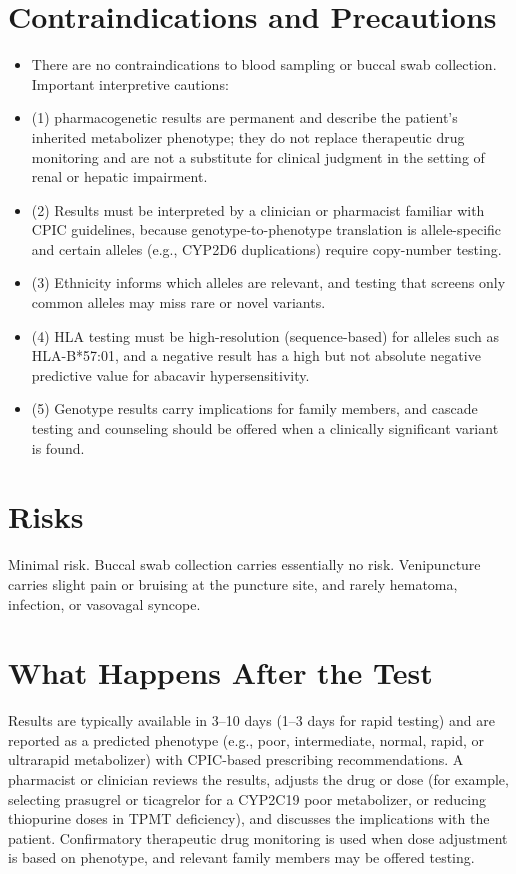 \section*{Contraindications and Precautions}
\begin{itemize}
  \item There are no contraindications to blood sampling or buccal swab collection. Important interpretive cautions:
  \item (1) pharmacogenetic results are permanent and describe the patient's inherited metabolizer phenotype; they do not replace therapeutic drug monitoring and are not a substitute for clinical judgment in the setting of renal or hepatic impairment.
  \item (2) Results must be interpreted by a clinician or pharmacist familiar with CPIC guidelines, because genotype-to-phenotype translation is allele-specific and certain alleles (e.g., CYP2D6 duplications) require copy-number testing.
  \item (3) Ethnicity informs which alleles are relevant, and testing that screens only common alleles may miss rare or novel variants.
  \item (4) HLA testing must be high-resolution (sequence-based) for alleles such as HLA-B*57:01, and a negative result has a high but not absolute negative predictive value for abacavir hypersensitivity.
  \item (5) Genotype results carry implications for family members, and cascade testing and counseling should be offered when a clinically significant variant is found.
\end{itemize}
\section*{Risks}
Minimal risk. Buccal swab collection carries essentially no risk. Venipuncture carries slight pain or bruising at the puncture site, and rarely hematoma, infection, or vasovagal syncope.

\section*{What Happens After the Test}
Results are typically available in 3--10 days (1--3 days for rapid testing) and are reported as a predicted phenotype (e.g., poor, intermediate, normal, rapid, or ultrarapid metabolizer) with CPIC-based prescribing recommendations. A pharmacist or clinician reviews the results, adjusts the drug or dose (for example, selecting prasugrel or ticagrelor for a CYP2C19 poor metabolizer, or reducing thiopurine doses in TPMT deficiency), and discusses the implications with the patient. Confirmatory therapeutic drug monitoring is used when dose adjustment is based on phenotype, and relevant family members may be offered testing.

